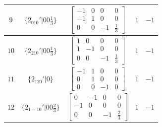 \documentclass[fleqn,8pt]{jsarticle}
\begin{document}
\begin{longtable}{ccccc}
$ 9 $ & $ \{2{}_{010}{}'|0 0 \frac{1}{3}\} $ & $ \begin{bmatrix} -1 & 0 & 0 & 0 \\ -1 & 1 & 0 & 0 \\ 0 & 0 & -1 & \frac{1}{3} \end{bmatrix} $ & $ 1 $ & $ -1 $ \\ \hline
$ 10 $ & $ \{2{}_{210}{}'|0 0 \frac{1}{3}\} $ & $ \begin{bmatrix} 1 & 0 & 0 & 0 \\ 1 & -1 & 0 & 0 \\ 0 & 0 & -1 & \frac{1}{3} \end{bmatrix} $ & $ 1 $ & $ -1 $ \\ \hline
$ 11 $ & $ \{2{}_{120}{}'|0\} $ & $ \begin{bmatrix} -1 & 1 & 0 & 0 \\ 0 & 1 & 0 & 0 \\ 0 & 0 & -1 & 0 \end{bmatrix} $ & $ 1 $ & $ -1 $ \\ \hline
$ 12 $ & $ \{2{}_{1-10}{}'|0 0 \frac{2}{3}\} $ & $ \begin{bmatrix} 0 & -1 & 0 & 0 \\ -1 & 0 & 0 & 0 \\ 0 & 0 & -1 & \frac{2}{3} \end{bmatrix} $ & $ 1 $ & $ -1 $ \\
\end{longtable}
\end{document}

